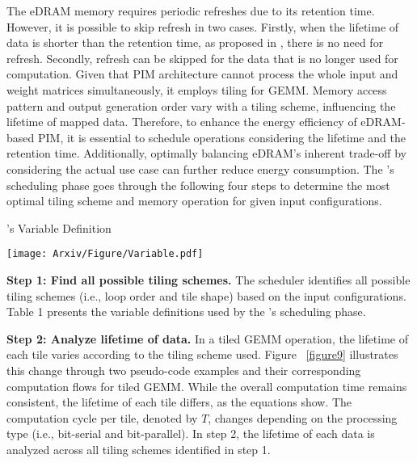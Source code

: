 The eDRAM memory requires periodic refreshes due to its retention time. However, it is possible to skip refresh in two cases. Firstly, when the lifetime of data is shorter than the retention time, as proposed in \cite{tu2018rana}, there is no need for refresh. Secondly, refresh can be skipped for the data that is no longer used for computation. Given that PIM architecture cannot process the whole input and weight matrices simultaneously, it employs tiling for GEMM. Memory access pattern and output generation order vary with a tiling scheme, influencing the lifetime of mapped data. Therefore, to enhance the energy efficiency of eDRAM-based PIM, it is essential to schedule operations considering the lifetime and the retention time. 
Additionally, optimally balancing eDRAM's inherent trade-off by considering the actual use case can further reduce energy consumption.
The \sysname’s scheduling phase goes through the following four steps to determine the most optimal tiling scheme and memory operation for given input configurations.

\begin{table}[t]
\centering
\caption{\sysname's Variable Definition}
\texttt{[image: Arxiv/Figure/Variable.pdf]}
\label{figure8}
\end{table}


\textbf{Step 1: Find all possible tiling schemes.} The scheduler identifies all possible tiling schemes (i.e., loop order and tile shape) based on the input configurations. Table 1 presents the variable definitions used by the \sysname's scheduling phase.  



\textbf{Step 2: Analyze lifetime of data.} In a tiled GEMM operation, the lifetime of each tile varies according to the tiling scheme used. Figure ~\ref{figure9} illustrates this change through two pseudo-code examples and their corresponding computation flows for tiled GEMM. While the overall computation time remains consistent, the lifetime of each tile differs, as the equations show. The computation cycle per tile, denoted by $T$, changes depending on the processing type (i.e., bit-serial and bit-parallel). In step 2, the lifetime of each data is analyzed across all tiling schemes identified in step 1. 



